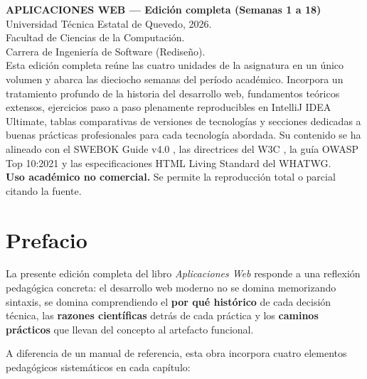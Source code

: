 \documentclass[11pt,a4paper,openany]{book}
\begin{document}
\thispagestyle{empty}
\vspace*{2cm}
\noindent\textbf{APLICACIONES WEB --- Edición completa (Semanas 1 a 18)}\\[0.3cm]
\noindent Universidad Técnica Estatal de Quevedo, 2026.\\
Facultad de Ciencias de la Computación.\\
Carrera de Ingeniería de Software (Rediseño).\\[0.4cm]
\noindent Esta edición completa reúne las cuatro unidades de la
asignatura en un único volumen y abarca las dieciocho semanas del
período académico. Incorpora un tratamiento profundo de la historia
del desarrollo web, fundamentos teóricos extensos, ejercicios paso a
paso plenamente reproducibles en IntelliJ IDEA Ultimate, tablas
comparativas de versiones de tecnologías y secciones dedicadas a
buenas prácticas profesionales para cada tecnología abordada. Su
contenido se ha alineado con el SWEBOK Guide v4.0
\cite{washizaki2024swebok}, las directrices del W3C
\cite{w3c2018wcag}, la guía OWASP Top 10:2021 \cite{owasp2021top10}
y las especificaciones HTML Living Standard del WHATWG.\\[0.4cm]
\noindent\textbf{Uso académico no comercial.} Se permite la
reproducción total o parcial citando la fuente.
\newpage

\chapter*{Prefacio}

La presente edición completa del libro \emph{Aplicaciones
Web} responde a una reflexión pedagógica concreta: el desarrollo web
moderno no se domina memorizando sintaxis, se domina comprendiendo el
\textbf{por qué histórico} de cada decisión técnica, las
\textbf{razones científicas} detrás de cada práctica y los
\textbf{caminos prácticos} que llevan del concepto al artefacto
funcional.

A diferencia de un manual de referencia, esta obra incorpora cuatro
elementos pedagógicos sistemáticos en cada capítulo:
\end{document}
